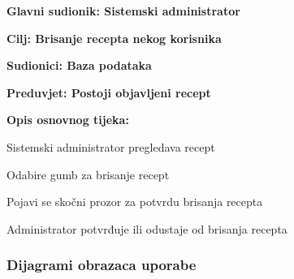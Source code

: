 	
	\noindent {}
	\begin{packed_item}
		
		\item \textbf{Glavni sudionik: Sistemski administrator}
		\item  \textbf{Cilj: Brisanje recepta nekog korisnika} 
		\item  \textbf{Sudionici: Baza podataka} 
		\item  \textbf{Preduvjet: Postoji objavljeni recept} 
		\item  \textbf{Opis osnovnog tijeka:}
		
		\item[] \begin{packed_enum}
			
			\item Sistemski administrator pregledava recept
			\item Odabire gumb za brisanje recept
			\item Pojavi se skočni prozor za potvrdu brisanja recepta
			\item Administrator potvrđuje ili odustaje od brisanja recepta
			
		\end{packed_enum}
		
	\end{packed_item}
		
				\eject
				\subsubsection{Dijagrami obrazaca uporabe}
					
